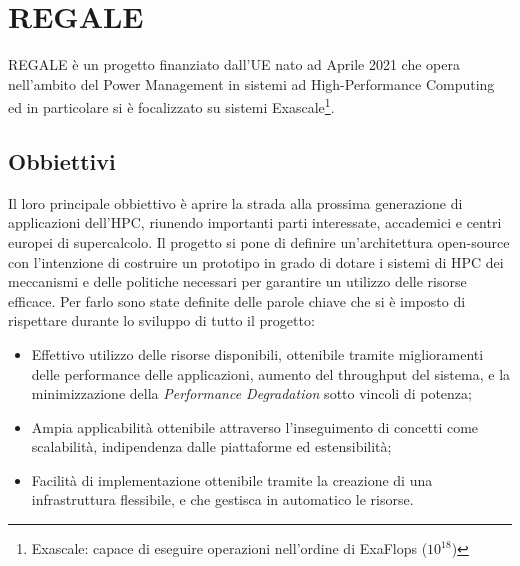 \chapter{REGALE}
REGALE\cite{REGALE} è un progetto finanziato dall'UE\cite{ue_REGALE} nato ad Aprile 2021 che opera nell'ambito del Power Management in sistemi ad High-Performance Computing ed in particolare si è focalizzato su sistemi Exascale\footnote{Exascale: capace di eseguire operazioni nell'ordine di ExaFlops ($10^{18}$)}.



\section{Obbiettivi}
Il loro principale obbiettivo è aprire la strada alla prossima generazione di applicazioni dell'HPC, riunendo importanti parti interessate, accademici e centri europei di supercalcolo. Il progetto si pone di definire un'architettura open-source con l'intenzione di costruire un prototipo in grado di dotare i sistemi di HPC dei meccanismi e delle politiche necessari per garantire un utilizzo delle risorse efficace\cite{ue_REGALE}. Per farlo sono state definite delle parole chiave che si è imposto di rispettare durante lo sviluppo di tutto il progetto:
\begin{itemize}
    \item Effettivo utilizzo delle risorse disponibili, ottenibile tramite miglioramenti delle performance delle applicazioni, aumento del throughput del sistema, e la minimizzazione della \emph{Performance Degradation} sotto vincoli di potenza;
    \item Ampia applicabilità ottenibile attraverso l'inseguimento di concetti come scalabilità, indipendenza dalle piattaforme ed estensibilità;
    \item Facilità di implementazione ottenibile tramite la creazione di una infrastruttura flessibile, e che gestisca in automatico le risorse.
\end{itemize}


